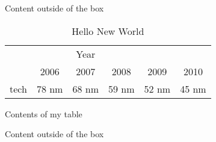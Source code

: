 \documentclass{article}
\newenvironment{mytable}[2]{%
		\begin{table}%
		\begin{lrbox}{\mytablebox}%
		\begin{minipage}{#2}%
		\caption{#1}%
	}{
		\end{minipage}%
		\end{lrbox}%
		\colorbox{orange}{\usebox{\mytablebox}}
		\end{table}%
	}
\begin{document}
Content outside of the box

\begin{mytable}{Hello New World}{3.25in}
	\begin{tabular}{|c|c|c|c|c|c|}
		\hline
        	& \multicolumn{3}{c}{Year} \\\cline{2-6}%
        & 2006  & 2007  & 2008  & 2009  & 2010 \\\cline{2-6}
        tech & 78 nm & 68 nm & 59 nm & 52 nm &  45 nm \\\hline%
	\end{tabular}
\end{mytable}

\begin{mytable}{Hello Moon}{2in}
	Contents of my table
\end{mytable}

Content outside of the box
\end{document}
